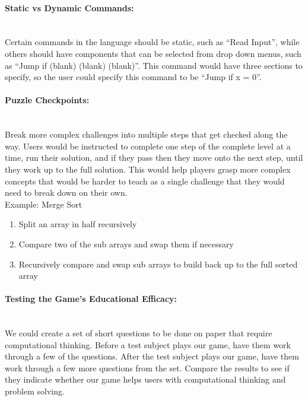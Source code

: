 \paragraph{Static vs Dynamic Commands:} ~\\
Certain commands in the language should be static, such as “Read Input”, while others should have components that can be selected from drop down menus, such as “Jump if (blank) (blank) (blank)”. This command would have three sections to specify, so the user could specify this command to be “Jump if x = 0”.\\

\paragraph{Puzzle Checkpoints:} ~\\
Break more complex challenges into multiple steps that get checked along the way. Users would be instructed to complete one step of the complete level at a time, run their solution, and if they pass then they move onto the next step, until they work up to the full solution. This would help players grasp more complex concepts that would be harder to teach as a single challenge that they would need to break down on their own.\\

Example: Merge Sort
\begin{enumerate}
                \item Split an array in half recursively
                \item Compare two of the sub arrays and swap them if necessary
                \item Recursively compare and swap sub arrays to build back up to the full sorted array
            \end{enumerate}

\paragraph{Testing the Game's Educational Efficacy:} ~\\
We could create a set of short questions to be done on paper that require computational thinking. Before a test subject plays our game, have them work through a few of the questions. After the test subject plays our game, have them work through a few more questions from the set. Compare the results to see if they indicate whether our game helps users with computational thinking and problem solving.\\

